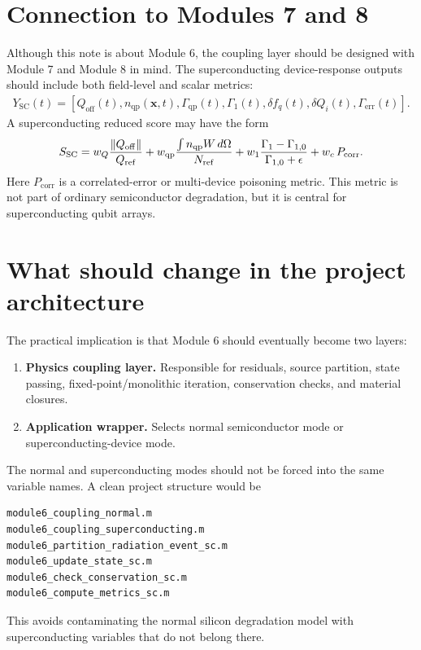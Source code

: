 \documentclass[11pt]{article}
\newcommand{\x}{\bm{x}}
\newcommand{\Qoff}{Q_{\mathrm{off}}}
\newcommand{\nqp}{n_{\mathrm{qp}}}
\newcommand{\Gammaqp}{\Gamma_{\mathrm{qp}}}
\newcommand{\Gammaone}{\Gamma_1}
\newcommand{\Gammaerr}{\Gamma_{\mathrm{err}}}
\begin{document}
\section{Connection to Modules 7 and 8}

Although this note is about Module 6, the coupling layer should be designed with Module 7 and Module 8 in mind. The superconducting device-response outputs should include both field-level and scalar metrics:
\begin{align}
Y_{\mathrm{SC}}(t)=
\left[
\Qoff(t),\nqp(\x,t),\Gammaqp(t),\Gammaone(t),\delta f_q(t),\delta Q_i(t),\Gammaerr(t)
\right].
\end{align}
A superconducting reduced score may have the form
\begin{equation}
S_{\mathrm{SC}}=
w_Q\frac{\|\Qoff\|}{Q_{\mathrm{ref}}}
+w_{\qp}\frac{\int \nqp W\,d\Omega}{N_{\mathrm{ref}}}
+w_1\frac{\Gammaone-\Gamma_{1,0}}{\Gamma_{1,0}+\epsilon}
+w_c\,P_{\mathrm{corr}}.
\end{equation}
Here \(P_{\mathrm{corr}}\) is a correlated-error or multi-device poisoning metric. This metric is not part of ordinary semiconductor degradation, but it is central for superconducting qubit arrays.

\section{What should change in the project architecture}

The practical implication is that Module 6 should eventually become two layers:

\begin{enumerate}[leftmargin=2em]
\item \textbf{Physics coupling layer.} Responsible for residuals, source partition, state passing, fixed-point/monolithic iteration, conservation checks, and material closures.
\item \textbf{Application wrapper.} Selects normal semiconductor mode or superconducting-device mode.
\end{enumerate}

The normal and superconducting modes should not be forced into the same variable names. A clean project structure would be
\begin{verbatim}
module6_coupling_normal.m
module6_coupling_superconducting.m
module6_partition_radiation_event_sc.m
module6_update_state_sc.m
module6_check_conservation_sc.m
module6_compute_metrics_sc.m
\end{verbatim}
This avoids contaminating the normal silicon degradation model with superconducting variables that do not belong there.
\end{document}
